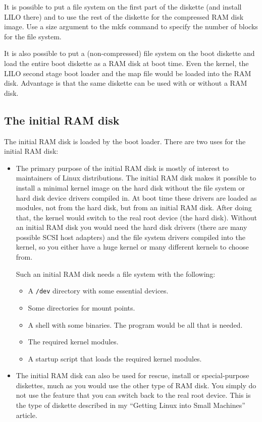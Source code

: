 \documentclass[12pt,a4paper]{article}
\begin{document}
It is possible to put a file system on the first part of the diskette
(and install LILO there) and to use the rest of the diskette for the
compressed RAM disk image. Use a size argument to the mkfs command to
specify the number of blocks for the file system.

It is also possible to put a (non-compressed) file system on the boot
diskette and load the entire boot diskette as a RAM disk at boot time. Even
the kernel, the LILO second stage boot loader and the map file would
be loaded into the RAM disk. Advantage is that the same diskette can
be used with or without a RAM disk.

\subsection{The initial RAM disk}

The initial RAM disk is loaded by the boot loader. There are two uses
for the initial RAM disk:
\begin{itemize}
\item The primary purpose of the initial RAM disk is mostly of
  interest to maintainers of Linux distributions. The initial RAM disk
  makes it possible to install a minimal kernel image on the hard disk
  without the file system or hard disk device drivers compiled in. At
  boot time these drivers are loaded as modules, not from the hard
  disk, but from an initial RAM disk. After doing that, the kernel
  would switch to the real root device (the hard disk). Without an
  initial RAM disk you would need the hard disk drivers (there are
  many possible SCSI host adapters) and the file system drivers
  compiled into the kernel, so you either have a huge kernel or many
  different kernels to choose from.

  Such an initial RAM disk needs a file system with the following:
  \begin{itemize}
  \item A {\tt /dev} directory with some essential devices.
  \item Some directories for mount points.
  \item A shell with some binaries. The  program would be all that is
  needed.
  \item The required kernel modules.
  \item A startup script that loads the required kernel modules.
  \end{itemize}
\item The initial RAM disk can also be used for rescue, install or
  special-purpose diskettes, much as you would use the other type of
  RAM disk. You simply do not use the feature that you can switch back
  to the real root device. This is the type of diskette described in
  my ``Getting Linux into Small Machines'' article.
\end{itemize}
\end{document}
